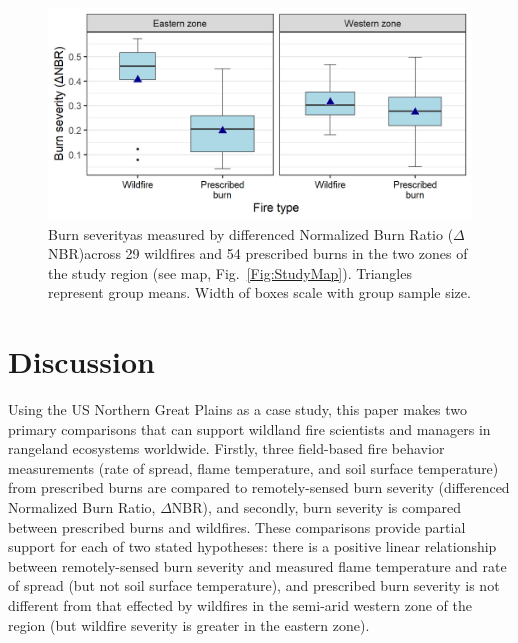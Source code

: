 \documentclass[fire,article,submit,oneauthor,pdftex]{Definitions/mdpi}
\begin{document}

\begin{figure}[t]
	\centering
	\includegraphics[width=1\columnwidth]{WF_v_Rx-1.png}
	\caption{Burn severity\textemdash as measured by differenced Normalized Burn Ratio ($\Delta$NBR)\textemdash across 29 wildfires and 54 prescribed burns in the two zones of the study region (see map, Fig.~\ref{Fig:StudyMap}). 
	Triangles represent group means. 
	Width of boxes scale with group sample size.   }
	\label{Fig:WF_Rx} %
\end{figure}

\section{Discussion} 

Using the US Northern Great Plains as a case study, this paper makes two primary comparisons that can support wildland fire scientists and managers in rangeland ecosystems worldwide. 
Firstly, three field-based fire behavior measurements (rate of spread, flame temperature, and soil surface temperature) from prescribed burns are compared to remotely-sensed burn severity (differenced Normalized Burn Ratio, $\Delta$NBR), and secondly, burn severity is compared between prescribed burns and wildfires. 
These comparisons provide partial support for each of two stated hypotheses: there is a positive linear relationship between remotely-sensed burn severity and measured flame temperature and rate of spread (but not soil surface temperature), and prescribed burn severity is not different from that effected by wildfires in the semi-arid western zone of the region (but wildfire severity is greater in the eastern zone). 
\end{document}

